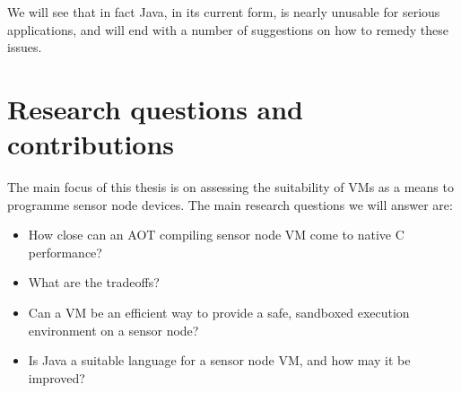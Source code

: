 We will see that in fact Java, in its current form, is nearly unusable for serious applications, and will end with a number of suggestions on how to remedy these issues.


\section{Research questions and contributions}
The main focus of this thesis is on assessing the suitability of VMs as a means to programme sensor node devices. The main research questions we will answer are:
\begin{itemize}
	\item How close can an AOT compiling sensor node VM come to native C performance?
	\item What are the tradeoffs?
	\item Can a VM be an efficient way to provide a safe, sandboxed execution environment on a sensor node?
	\item Is Java a suitable language for a sensor node VM, and how may it be improved?
\end{itemize}

